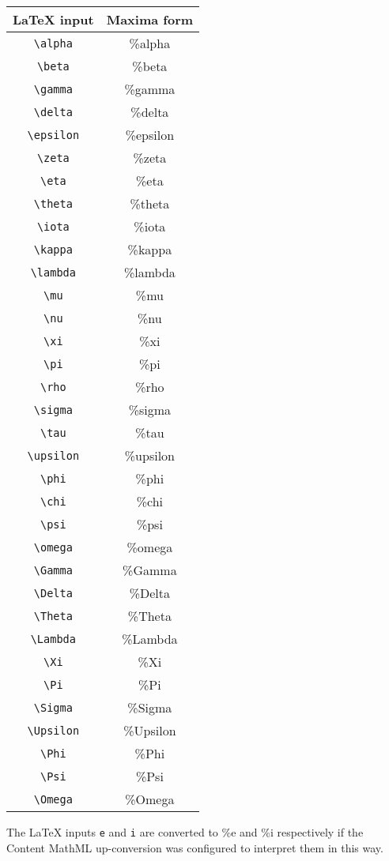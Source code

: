 \begin{tabular}{|c|c|}
\hline
LaTeX input & Maxima form \\
\hline
\verb|\alpha| & \%alpha \\
\verb|\beta| & \%beta \\
\verb|\gamma| & \%gamma \\
\verb|\delta| & \%delta \\
\verb|\epsilon| & \%epsilon \\
\verb|\zeta| & \%zeta \\
\verb|\eta| & \%eta \\
\verb|\theta| & \%theta \\
\verb|\iota| & \%iota \\
\verb|\kappa| & \%kappa \\
\verb|\lambda| & \%lambda \\
\verb|\mu| & \%mu \\
\verb|\nu| & \%nu \\
\verb|\xi| & \%xi \\
\verb|\pi| & \%pi \\
\verb|\rho| & \%rho \\
\verb|\sigma| & \%sigma \\
\verb|\tau| & \%tau \\
\verb|\upsilon| & \%upsilon \\
\verb|\phi| & \%phi \\
\verb|\chi| & \%chi \\
\verb|\psi| & \%psi \\
\verb|\omega| & \%omega \\
\verb|\Gamma| & \%Gamma \\
\verb|\Delta| & \%Delta \\
\verb|\Theta| & \%Theta \\
\verb|\Lambda| & \%Lambda \\
\verb|\Xi| & \%Xi \\
\verb|\Pi| & \%Pi \\
\verb|\Sigma| & \%Sigma \\
\verb|\Upsilon| & \%Upsilon \\
\verb|\Phi| & \%Phi \\
\verb|\Psi| & \%Psi \\
\verb|\Omega| & \%Omega \\
\hline
\hline
\end{tabular}

The LaTeX inputs \verb|e| and \verb|i| are converted to \%e
and \%i respectively if the Content MathML up-conversion
was configured to interpret them in this way.

